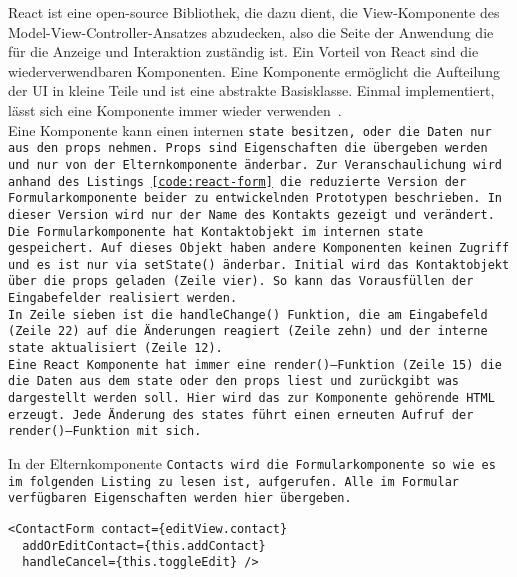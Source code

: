 React ist eine open-source Bibliothek, die dazu dient, die View-Komponente des Model-View-Controller-Ansatzes abzudecken, also die Seite der Anwendung die für die Anzeige und Interaktion zuständig ist. Ein Vorteil von React sind die wiederverwendbaren Komponenten. Eine Komponente ermöglicht die Aufteilung der \gls{UI} in kleine Teile und ist eine abstrakte Basisklasse. Einmal implementiert, lässt sich eine Komponente immer wieder verwenden~\cite{react}.\\
Eine Komponente kann einen internen \tt{state} besitzen, oder die Daten nur aus den \tt{props} nehmen. \tt{Props} sind Eigenschaften die übergeben werden und nur von der Elternkomponente änderbar.
Zur Veranschaulichung wird anhand des Listings \ref{code:react-form} die reduzierte Version der Formularkomponente beider zu entwickelnden Prototypen beschrieben. In dieser Version wird nur der Name des Kontakts gezeigt und verändert.\\
Die Formularkomponente hat Kontaktobjekt im internen \tt{state} gespeichert. Auf dieses Objekt haben andere Komponenten keinen Zugriff und es ist nur via \tt{setState()} änderbar.
Initial wird das Kontaktobjekt über die \tt{props} geladen (Zeile vier). So kann das Vorausfüllen der Eingabefelder realisiert werden.\\
In Zeile sieben ist die \tt{handleChange()} Funktion, die am Eingabefeld (Zeile 22) auf die Änderungen reagiert (Zeile zehn) und der interne \tt{state} aktualisiert (Zeile 12).\\
Eine React Komponente hat immer eine \tt{render()}--Funktion (Zeile 15) die die Daten aus dem \tt{state} oder den \tt{props} liest und zurückgibt was dargestellt werden soll. Hier wird das zur Komponente gehörende \gls{HTML} erzeugt. Jede Änderung des \tt{state}s führt einen erneuten Aufruf der \tt{render()}--Funktion mit sich.
\begin{center}

\end{center}
In der Elternkomponente \tt{Contacts} wird die Formularkomponente so wie es im folgenden Listing zu lesen ist, aufgerufen. Alle im Formular verfügbaren Eigenschaften werden hier übergeben.
\begin{lstlisting}
<ContactForm contact={editView.contact}
  addOrEditContact={this.addContact}
  handleCancel={this.toggleEdit} />
\end{lstlisting}
